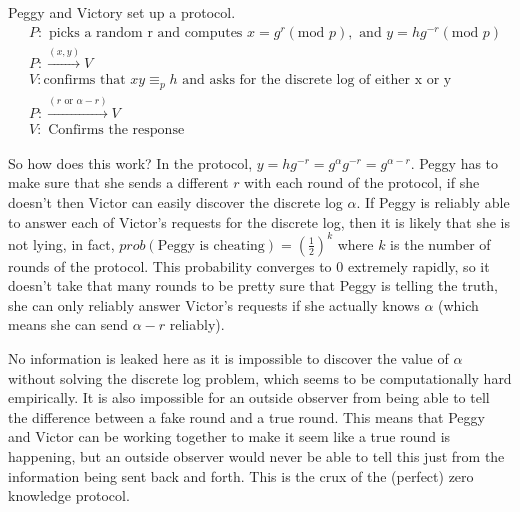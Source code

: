 \documentclass[12pt,a4paper]{article}
\begin{document}
Peggy and Victory set up a protocol. 
\begin{align*}
	&P: \text{ picks a random r and computes } x = g^{r} (\text{mod } p), \text{ and } y = hg^{-r} (\text{mod } p) \\
	&P: \xrightarrow{(x,y)} V \\
	&V: \text{confirms that } xy \equiv_{p} h \text{ and asks for the discrete log of either x or y} \\
	&P : \xrightarrow{(r \text{ or } \alpha-r)} V \\
	&V: \text{ Confirms the response} 
\end{align*}

So how does this work? In the protocol, $y = hg^{-r} = g^{\alpha}g^{-r} = g^{\alpha - r}$. Peggy has to make sure that she sends a different $r$ with each round of the protocol, if she doesn't then Victor can easily discover the discrete log $\alpha$. If Peggy is reliably able to answer each of Victor's requests for the discrete log, then it is likely that she is not lying, in fact, $prob(\text{Peggy is cheating}) = \left(\frac{1}{2}\right)^{k}$ where $k$ is the number of rounds of the protocol. This probability converges to 0 extremely rapidly, so it doesn't take that many rounds to be pretty sure that Peggy is telling the truth, she can only reliably answer Victor's requests if she actually knows $\alpha$ (which means she can send $\alpha - r$ reliably). 

No information is leaked here as it is impossible to discover the value of $\alpha$ without solving the discrete log problem, which seems to be computationally hard empirically. It is also impossible for an outside observer from being able to tell the difference between a fake round and a true round. This means that Peggy and Victor can be working together to make it seem like a true round is happening, but an outside observer would never be able to tell this just from the information being sent back and forth. This is the crux of the (perfect) zero knowledge protocol. 
\end{document}
